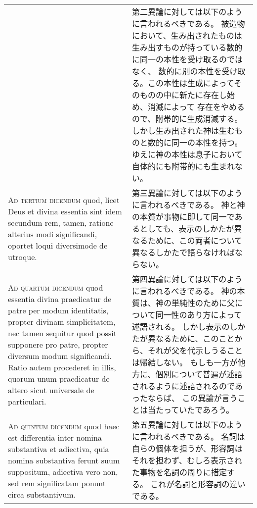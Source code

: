 \documentclass[10pt]{jsarticle} %
\begin{document}
\begin{longtable}{p{21em}p{21em}}
&

第二異論に対しては以下のように言われるべきである。
被造物において、生み出されたものは生み出すものが持っている数的に同一の本性を受け取るのではなく、
数的に別の本性を受け取る。この本性は生成によってそのものの中に新たに存在し始め、消滅によって
存在をやめるので、附帯的に生成消滅する。
しかし生み出された神は生むものと数的に同一の本性を持つ。
ゆえに神の本性は息子において自体的にも附帯的にも生まれない。

\\


\textsc{Ad tertium dicendum} quod, licet Deus et divina essentia sint idem secundum rem,
tamen, ratione alterius modi significandi, oportet loqui diversimode de
utroque.


&

第三異論に対しては以下のように言われるべきである。
神と神の本質が事物に即して同一であるとしても、表示のしかたが異なるために、この両者について異なるしかたで語らなければならない。

\\


\textsc{Ad quartum dicendum} quod essentia divina praedicatur de patre per modum
identitatis, propter divinam simplicitatem, nec tamen sequitur quod possit
supponere pro patre, propter diversum modum significandi. Ratio autem
procederet in illis, quorum unum praedicatur de altero sicut universale de
particulari.


&

第四異論に対しては以下のように言われるべきである。
神の本質は、神の単純性のために父について同一性のあり方によって述語される。
しかし表示のしかたが異なるために、このことから、それが父を代示しうることは帰結しない。
もしも一方が他方に、個別について普遍が述語されるように述語されるのであったならば、
この異論が言うことは当たっていたであろう。


\\


\textsc{Ad quintum dicendum} quod haec est differentia inter nomina substantiva et
adiectiva, quia nomina substantiva ferunt suum suppositum, adiectiva vero non,
sed rem significatam ponunt circa substantivum. 



&

第五異論に対しては以下のように言われるべきである。
名詞は自らの個体を担うが、形容詞はそれを担わず、むしろ表示された事物を名詞の周りに措定する。
これが名詞と形容詞の違いである。

\\


\end{longtable}
\end{document}

